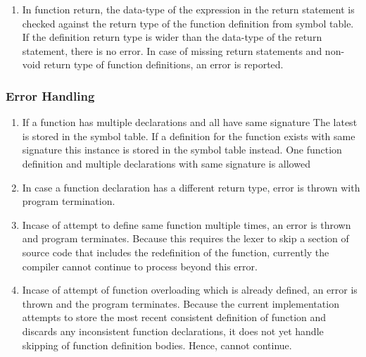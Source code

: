 \documentclass[12pt]{article}
\begin{document}
\begin{enumerate}
\begin{enumerate}
\begin{enumerate}
\item In function return, the data-type of the expression in the return statement is checked against the return type of the function definition from symbol table. If the definition return type is wider than the data-type of the return statement, there is no error. In case of missing return statements and non-void return type of function definitions, an error is reported.

\end{enumerate}
\end{enumerate}

\subsubsection{Error Handling}
\label{FS}
\begin{enumerate}
\item If a function has multiple declarations and all have same signature The latest is stored in the symbol table. If a definition for the function exists with same signature this instance is stored in the symbol table instead. One function definition and multiple declarations with same signature is allowed

\item In case a function declaration has a different return type,  error is thrown with program termination.

\item Incase of attempt to define same function multiple times, an error is thrown and program terminates.
Because this requires the lexer to skip a section of source code that includes the redefinition of the function, currently the compiler cannot continue to process beyond this error. 
\item Incase of attempt of function overloading which is already defined, an error is thrown and the program terminates. Because the current implementation attempts to store the most recent consistent definition of function and discards any inconsistent function declarations, it does not yet handle skipping of function definition bodies. Hence, cannot continue.
\end{enumerate}


\end{enumerate}
\end{document}
